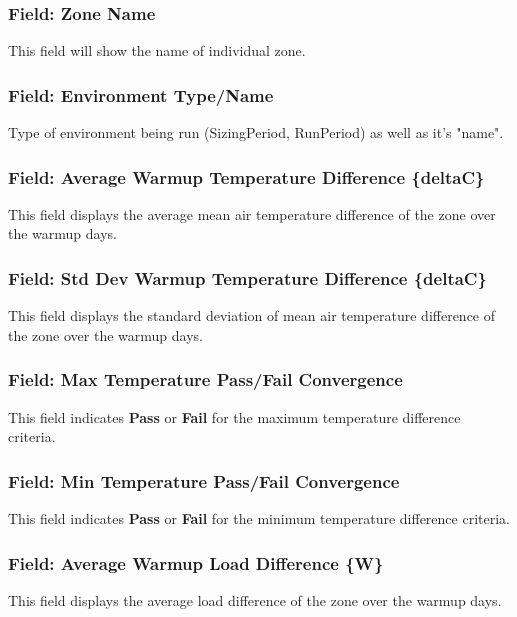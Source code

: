 \subsubsection{Field: Zone Name}

This field will show the name of individual zone.

\subsubsection{Field: Environment Type/Name}

Type of environment being run (SizingPeriod, RunPeriod) as well as it’s "name".

\subsubsection{Field: Average Warmup Temperature Difference \{deltaC\}}

This field displays the average mean air temperature difference of the zone over the warmup days.

\subsubsection{Field: Std Dev Warmup Temperature Difference \{deltaC\}}

This field displays the standard deviation of mean air temperature difference of the zone over the warmup days.

\subsubsection{Field: Max Temperature Pass/Fail Convergence}

This field indicates \textbf{Pass} or \textbf{Fail} for the maximum temperature difference criteria.

\subsubsection{Field: Min Temperature Pass/Fail Convergence}

This field indicates \textbf{Pass} or \textbf{Fail} for the minimum temperature difference criteria.

\subsubsection{Field: Average Warmup Load Difference \{W\}}

This field displays the average load difference of the zone over the warmup days.

